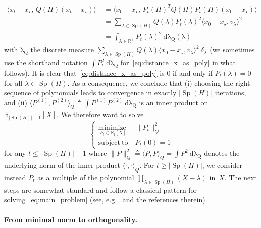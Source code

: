 \documentclass{article}
\def\Sp{\operatorname{Sp}}
\newcommand{\xs}{x_\star}
\renewcommand{\leq}{\leqslant}
\renewcommand{\geq}{\geqslant}
\begin{document}
        \begin{align}
            \langle x_t - \xs,\, Q(H) (x_t - \xs)\rangle &~ = \langle x_0 - \xs,\, P_t(H)^T Q(H) P_t(H) (x_0 - \xs)\rangle \\
            &~ = \sum_{\lambda\in \Sp(H)} Q(\lambda) P_t(\lambda)^2 \langle x_0 - \xs, v_{\lambda} \rangle^2 \\
            &~ = \displaystyle\int_{\lambda \in \mathbb{R}^+} P_t(\lambda)^2 ~ \mathrm{d\lambda_Q(\lambda)} \label{eq:distance_x_as_poly}
        \end{align}
        with $\mathrm{\lambda_Q}$ the discrete measure $\sum_{\lambda\in \Sp(H)} Q(\lambda) \langle x_0 - \xs, v_{\lambda} \rangle^2 ~ \delta_{\lambda}$ (we sometimes use the shorthand notation $\int P_t^2 ~ \mathrm{d\lambda_Q}$ for~\cref{eq:distance_x_as_poly} in what follows).
        It is clear that~\cref{eq:distance_x_as_poly} is $0$ if and only if $P_t(\lambda) = 0$ for all $\lambda\in \Sp(H)$.
        As a consequence, we conclude that (i) choosing the right sequence of polynomials leads to convergence in exactly $|\Sp(H)|$ iterations, and (ii) $\langle P^{(1)}, P^{(2)} \rangle_{Q} \triangleq \int P^{(1)}P^{(2)} ~ \mathrm{d\lambda_Q}$ is an inner product on $\mathbb{R}_{|\Sp(H)|-1}[X]$.
        We therefore want to solve
        \begin{equation}
            \left\{
            \begin{array}{ll}
                \underset{P_t \in \mathbb{R}_t[X]}{\mathrm{minimize~}} & \| P_t \|_Q^2 \\
                \mathrm{subject~to~} & P_t(0)=1
            \end{array}
            \right.
            \label{eq:main_problem}
        \end{equation}
        for any $t \leq |\Sp(H)| - 1$ where $\| P \|_Q^2 \triangleq \langle P, P \rangle_{Q} = \int P^2 ~ \mathrm{d\lambda_Q}$ denotes the underlying norm of the inner product $\langle \cdot, \cdot \rangle_{Q}$.
        For $t \geq |\Sp(H)|$, we consider instead $P_t$ as a multiple of the polynomial $\prod_{\lambda\in \Sp(H)} (X - \lambda)$ in~$X$.
        The next steps are somewhat standard and follow a classical pattern for solving~\cref{eq:main_problem} (see, e.g.\ \citet{berthier2020accelerated} and the references therein).

    \paragraph{From minimal norm to orthogonality.}
\end{document}
